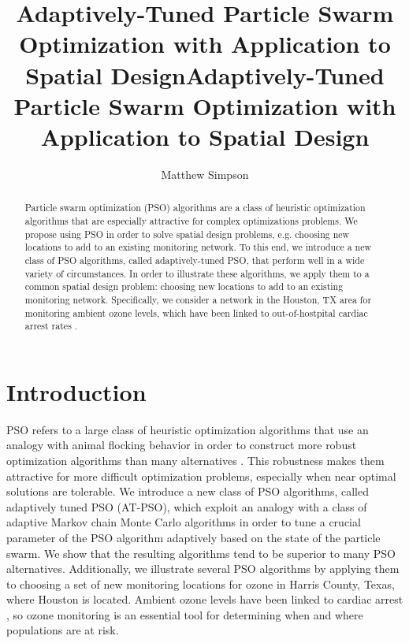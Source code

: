 \documentclass[cmbright]{staauth}
\begin{document}
\blind
{
  \title{Adaptively-Tuned Particle Swarm Optimization with Application to Spatial Design}
  \author{Matthew Simpson\corrauth}
  \address{Department of Statistics, University of Missouri,\\
    146 Middlebush Hall, Columbia, MO 65211-6100}
}\fi

\blind
{
  \title{Adaptively-Tuned Particle Swarm Optimization with Application to Spatial Design}
  \author{}
  \address{}
  \corremail{}
  \received{}
  \accepted{}
}\fi
\begin{abstract}
Particle swarm optimization (PSO) algorithms are a class of heuristic optimization algorithms that are especially attractive for complex optimizations problems. We propose using PSO in order to solve spatial design problems, e.g. choosing new locations to add to an existing monitoring network. To this end, we introduce a new class of PSO algorithms, called adaptively-tuned PSO, that perform well in a wide variety of circumstances. In order to illustrate these algorithms, we apply them to a common spatial design problem: choosing new locations to add to an existing monitoring network. Specifically, we consider a network in the Houston, TX area for monitoring ambient ozone levels, which have been linked to out-of-hostpital cardiac arrest rates \citep{ensor2013case}.
\end{abstract}
\maketitle

\section{Introduction}
PSO refers to a large class of heuristic optimization algorithms that use an analogy with animal flocking behavior in order to construct more robust optimization algorithms than many alternatives \citep{clerc2002particle,blum2008swarm,clerc2010particle}. This robustness makes them attractive for more difficult optimization problems, especially when near optimal solutions are tolerable. We introduce a new class of PSO algorithms, called adaptively tuned PSO (AT-PSO), which exploit an analogy with a class of adaptive Markov chain Monte Carlo algorithms in order to tune a crucial parameter of the PSO algorithm adaptively based on the state of the particle swarm. We show that the resulting algorithms tend to be superior to many PSO alternatives. Additionally, we illustrate several PSO algorithms by applying them to choosing a set of new monitoring locations for ozone in Harris County, Texas, where Houston is located. Ambient ozone levels have been linked to cardiac arrest \citep{ensor2013case}, so ozone monitoring is an essential tool for determining when and where populations are at risk.
\end{document}
